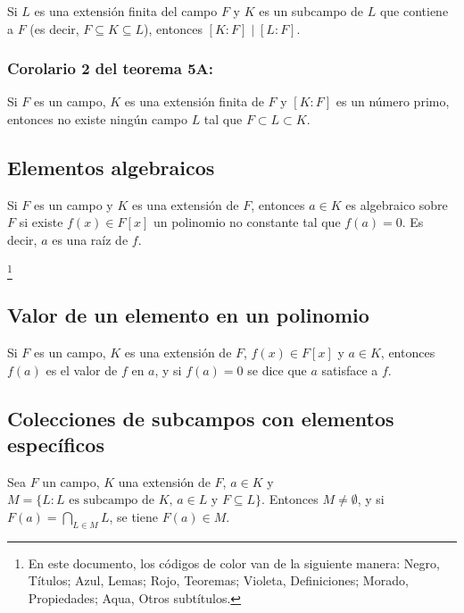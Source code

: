 \documentclass{article}
\newcommand\blfootnote[1]{%
  \begingroup
  \renewcommand\thefootnote{}\footnote{#1}%
  \addtocounter{footnote}{-1}%
  \endgroup
}
\renewcommand{\headrulewidth}{2pt}
\begin{document}
Si $L$ es una extensión finita del campo $F$ y $K$ es un subcampo de $L$ que contiene a $F$ (es decir, $F\subseteq K\subseteq L$), entonces $[K:F]\mid[L:F]$.

\subsubsection*{\color{red} Corolario 2 del teorema 5A:}

Si $F$ es un campo, $K$ es una extensión finita de $F$ y $[K:F]$ es un número primo, entonces no existe ningún campo $L$ tal que $F\subset L\subset K$.

\subsection*{\color{violet} Elementos algebraicos}

Si $F$ es un campo y $K$ es una extensión de $F$, entonces $a\in K$ es algebraico sobre $F$ si existe $f(x)\in F[x]$ un polinomio no constante tal que $f(a)=0$. Es decir, $a$ es una raíz de $f$.

\blfootnote{En este documento, los códigos de color van de la siguiente manera: Negro, Títulos; \color{blue} Azul, Lemas; \color{red} Rojo, Teoremas; \color{violet} Violeta, Definiciones; \color{purple} Morado, Propiedades; \color{teal} Aqua, Otros subtítulos.}

\newpage
\pagestyle{fancy}
\fancyhf{}
\renewcommand{\headrulewidth}{2pt}
\fancyfoot{}
\rfoot{\thepage}
\lfoot{}
\setlength{\headheight}{28pt}

\subsection*{\color{violet} Valor de un elemento en un polinomio}

Si $F$ es un campo, $K$ es una extensión de $F$, $f(x)\in F[x]$ y $a\in K$, entonces $f(a)$ es el valor de $f$ en $a$, y si $f(a)=0$ se dice que $a$ satisface a $f$.

\subsection*{\color{purple} Colecciones de subcampos con elementos específicos}

Sea $F$ un campo, $K$ una extensión de $F$, $a\in K$ y $M=\{L: \text{$L$ es subcampo de $K$, $a\in L$ y $F\subseteq L$}\}$. Entonces $M\neq\emptyset$, y si $F(a)=\displaystyle\bigcap_{L\in M} L$, se tiene $F(a)\in M$.
\end{document}
